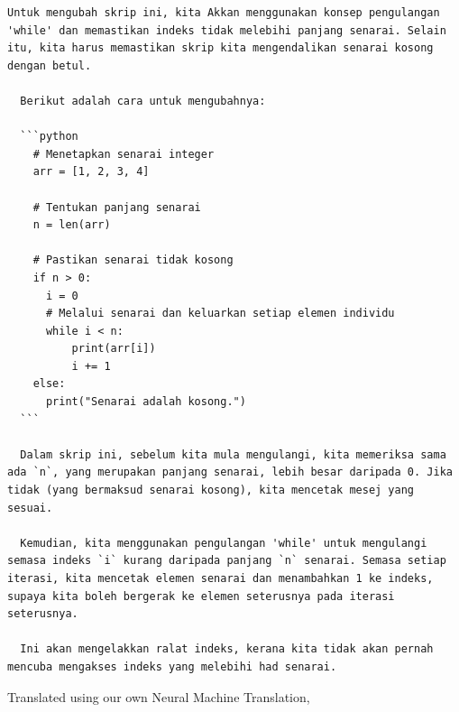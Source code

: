 \documentclass{article}
\begin{document}
\begin{lstlisting}[breaklines=true]
  Untuk mengubah skrip ini, kita Akkan menggunakan konsep pengulangan 'while' dan memastikan indeks tidak melebihi panjang senarai. Selain itu, kita harus memastikan skrip kita mengendalikan senarai kosong dengan betul.

  Berikut adalah cara untuk mengubahnya:

  ```python
    # Menetapkan senarai integer
    arr = [1, 2, 3, 4]

    # Tentukan panjang senarai
    n = len(arr)

    # Pastikan senarai tidak kosong
    if n > 0:
      i = 0
      # Melalui senarai dan keluarkan setiap elemen individu
      while i < n:
          print(arr[i])
          i += 1
    else:
      print("Senarai adalah kosong.")
  ```

  Dalam skrip ini, sebelum kita mula mengulangi, kita memeriksa sama ada `n`, yang merupakan panjang senarai, lebih besar daripada 0. Jika tidak (yang bermaksud senarai kosong), kita mencetak mesej yang sesuai.

  Kemudian, kita menggunakan pengulangan 'while' untuk mengulangi semasa indeks `i` kurang daripada panjang `n` senarai. Semasa setiap iterasi, kita mencetak elemen senarai dan menambahkan 1 ke indeks, supaya kita boleh bergerak ke elemen seterusnya pada iterasi seterusnya.

  Ini akan mengelakkan ralat indeks, kerana kita tidak akan pernah mencuba mengakses indeks yang melebihi had senarai.
\end{lstlisting}

\pagebreak

Translated using our own Neural Machine Translation,
\end{document}
